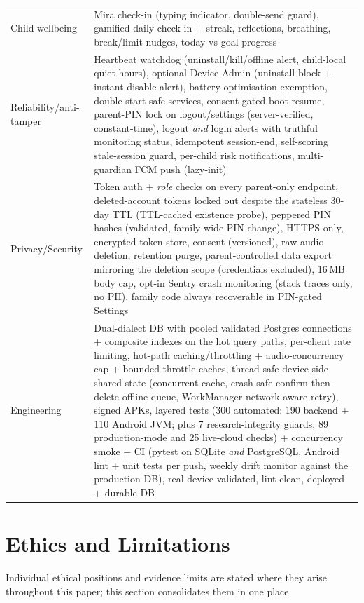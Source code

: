 \documentclass[11pt,a4paper]{article}
\begin{document}
\begin{center}
\begin{tabularx}{\linewidth}{lX}
Child wellbeing & Mira check-in (typing indicator, double-send guard), gamified daily check-in + streak, reflections, breathing, break/limit nudges, today-vs-goal progress \\
Reliability/anti-tamper & Heartbeat watchdog (uninstall/kill/offline alert, child-local quiet hours), optional Device Admin (uninstall block + instant disable alert), battery-optimisation exemption, double-start-safe services, consent-gated boot resume, parent-PIN lock on logout/settings (server-verified, constant-time), logout \emph{and} login alerts with truthful monitoring status, idempotent session-end, self-scoring stale-session guard, per-child risk notifications, multi-guardian FCM push (lazy-init) \\
Privacy/Security & Token auth + \emph{role} checks on every parent-only endpoint, deleted-account tokens locked out despite the stateless 30-day TTL (TTL-cached existence probe), peppered PIN hashes (validated, family-wide PIN change), HTTPS-only, encrypted token store, consent (versioned), raw-audio deletion, retention purge, parent-controlled data export mirroring the deletion scope (credentials excluded), 16\,MB body cap, opt-in Sentry crash monitoring (stack traces only, no PII), family code always recoverable in PIN-gated Settings \\
Engineering & Dual-dialect DB with pooled validated Postgres connections + composite indexes on the hot query paths, per-client rate limiting, hot-path caching/throttling + audio-concurrency cap + bounded throttle caches, thread-safe device-side shared state (concurrent cache, crash-safe confirm-then-delete offline queue, WorkManager network-aware retry), signed APKs, layered tests (300 automated: 190 backend + 110 Android JVM; plus 7 research-integrity guards, 89 production-mode and 25 live-cloud checks) + concurrency smoke + CI (pytest on SQLite \emph{and} PostgreSQL, Android lint + unit tests per push, weekly drift monitor against the production DB), real-device validated, lint-clean, deployed + durable DB \\
\bottomrule
\end{tabularx}
\end{center}

\section{Ethics and Limitations}
Individual ethical positions and evidence limits are stated where they arise
throughout this paper; this section consolidates them in one place.
\end{document}
